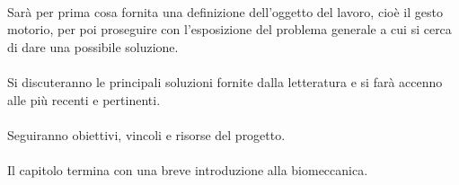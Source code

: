 {\bfseries
\vspace{1in}

\paragraph{}
Sarà per prima cosa fornita una definizione dell'oggetto del lavoro,
cioè il {\rm gesto motorio}, per poi proseguire con l'esposizione del problema generale
a cui si cerca di dare una possibile soluzione.


\paragraph{}
Si discuteranno le principali soluzioni fornite dalla letteratura
e si farà accenno alle più recenti e pertinenti.

\paragraph{}
Seguiranno obiettivi, vincoli e risorse del progetto.

\paragraph{}
Il capitolo termina con una breve introduzione alla biomeccanica.

\vfill
}